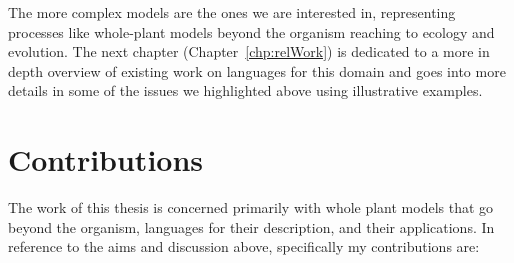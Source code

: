 The more complex models are the ones we are interested in, representing
processes like whole-plant models beyond the organism reaching to ecology and
evolution. The next chapter (Chapter~\ref{chp:relWork}) is dedicated to a more
in depth overview of existing work on languages for this domain and goes into
more details in some of the issues we highlighted above using illustrative
examples.


\section{Contributions}
The work of this thesis is concerned primarily with whole plant models that go
beyond the organism, languages for their description, and their applications. In
reference to the aims and discussion above, specifically my contributions are:

